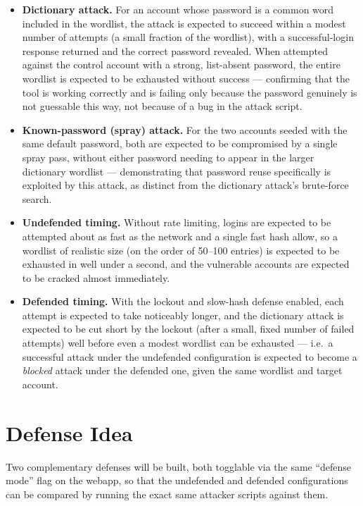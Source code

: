 \documentclass[11pt]{article}
\begin{document}
\begin{itemize}[leftmargin=*]
  \item \textbf{Dictionary attack.} For an account whose password is a common word
    included in the wordlist, the attack is expected to succeed within a modest
    number of attempts (a small fraction of the wordlist), with a successful-login
    response returned and the correct password revealed. When attempted against the
    control account with a strong, list-absent password, the entire wordlist is
    expected to be exhausted without success --- confirming that the tool is working
    correctly and is failing only because the password genuinely is not guessable
    this way, not because of a bug in the attack script.
  \item \textbf{Known-password (spray) attack.} For the two accounts seeded with the
    same default password, both are expected to be compromised by a single spray
    pass, without either password needing to appear in the larger dictionary
    wordlist --- demonstrating that password reuse specifically is exploited by this
    attack, as distinct from the dictionary attack's brute-force search.
  \item \textbf{Undefended timing.} Without rate limiting, logins are expected to be
    attempted about as fast as the network and a single fast hash allow, so a
    wordlist of realistic size (on the order of 50--100 entries) is expected to be
    exhausted in well under a second, and the vulnerable accounts are expected to be
    cracked almost immediately.
  \item \textbf{Defended timing.} With the lockout and slow-hash defense enabled,
    each attempt is expected to take noticeably longer, and the dictionary attack is
    expected to be cut short by the lockout (after a small, fixed number of failed
    attempts) well before even a modest wordlist can be exhausted --- i.e.\ a
    successful attack under the undefended configuration is expected to become a
    \emph{blocked} attack under the defended one, given the same wordlist and target
    account.
\end{itemize}

\section{Defense Idea}

Two complementary defenses will be built, both togglable via the same ``defense
mode'' flag on the webapp, so that the undefended and defended configurations can be
compared by running the exact same attacker scripts against them.
\end{document}
